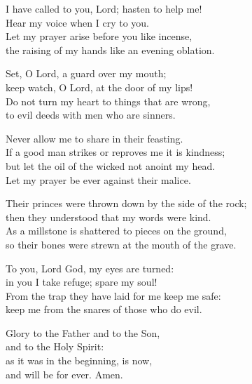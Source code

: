 \settowidth{\versewidth}{Their princes were thrown down by the side of the rock;}
\begin{psalmverse}%
I have called to you, Lord; hasten to help me!\\
    Hear my voice when I cry to you.\\
Let my prayer arise before you like incense,\\
    the raising of my hands like an evening oblation.

Set, O Lord, a guard over my mouth;\\
    keep watch, O Lord, at the door of my lips!\\
Do not turn my heart to things that are wrong,\\
    to evil deeds with men who are sinners.

Never allow me to share in their feasting.\\
    If a good man strikes or reproves me it is kindness;\\
but let the oil of the wicked not anoint my head.\\
    Let my prayer be ever against their malice.

Their princes were thrown down by the side of the rock;\\
    then they understood that my words were kind.\\
As a millstone is shattered to pieces on the ground,\\
    so their bones were strewn at the mouth of the grave.

To you, Lord God, my eyes are turned:\\
    in you I take refuge; spare my soul!\\
From the trap they have laid for me keep me safe:\\
    keep me from the snares of those who do evil.

Glory to the Father and to the Son,\\
    and to the Holy Spirit:\\
as it was in the beginning, is now,\\
    and will be for ever. Amen.
\end{psalmverse}
